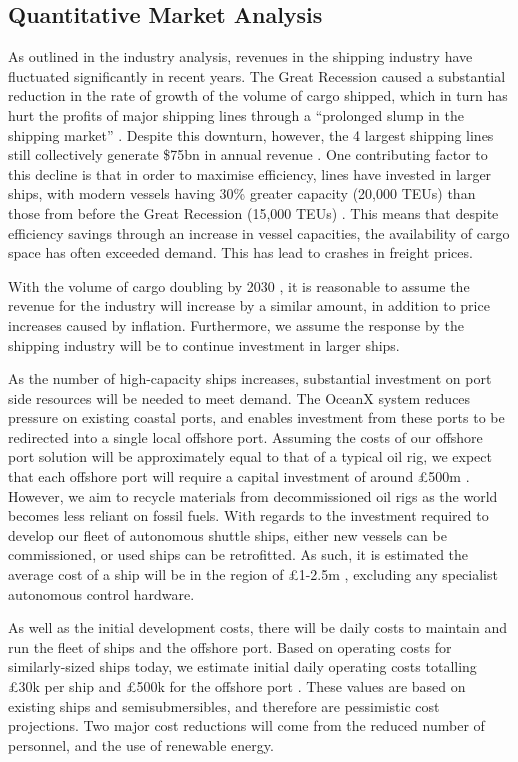 \subsection{Quantitative Market Analysis}

As outlined in the industry analysis, revenues in the shipping industry have fluctuated significantly in recent years. The Great Recession caused a substantial reduction in the rate of growth of the volume of cargo shipped, which in turn has hurt the profits of major shipping lines through a “prolonged slump in the shipping market” \cite{globalCrisis}. Despite this downturn, however, the 4 largest shipping lines still collectively generate \$75bn in annual revenue \cite{TroubledWaters}. One contributing factor to this decline is that in order to maximise efficiency, lines have invested in larger ships, with modern vessels having 30\% greater capacity (20,000 TEUs) than those from before the Great Recession (15,000 TEUs) \cite{ftarticle}. This means that despite efficiency savings through an increase in vessel capacities, the availability of cargo space has often exceeded demand. This has lead to crashes in freight prices.

With the volume of cargo doubling by 2030 \cite{BluePlanet}, it is reasonable to assume the revenue for the industry will increase by a similar amount, in addition to price increases caused by inflation. Furthermore, we assume the response by the shipping industry will be to continue investment in larger ships.

As the number of high-capacity ships increases, substantial investment on port side resources will be needed to meet demand. The OceanX system reduces pressure on existing coastal ports, and enables investment from these ports to be redirected into a single local offshore port. Assuming the costs of our offshore port solution will be approximately equal to that of a typical oil rig, we expect that each offshore port will require a capital investment of around £500m \cite{MaerskRigs}. However, we aim to recycle materials from decommissioned oil rigs as the world becomes less reliant on fossil fuels. With regards to the investment required to  develop our fleet of autonomous shuttle ships, either new vessels can be commissioned, or used ships can be retrofitted. As such, it is estimated the average cost of a ship will be in the region of £1-2.5m \cite{forsale}, excluding any specialist autonomous control hardware.

As well as the initial development costs, there will be daily costs to maintain and run the fleet of ships and the offshore port. Based on operating costs for similarly-sized ships today, we estimate initial daily operating costs totalling £30k per ship \cite{DailyOperatingCostsShips} and £500k for the offshore port \cite{DailyOperatingCostsOilRig}. These values are based on existing ships and semisubmersibles, and therefore are pessimistic cost projections. Two major cost reductions will come from the reduced number of personnel, and the use of renewable energy.

